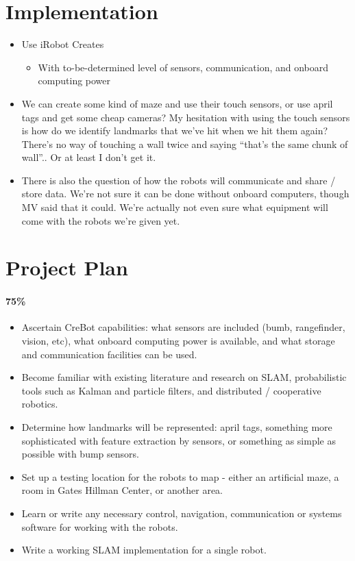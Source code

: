 \documentclass[11pt]{article}
\begin{document}
\section{Implementation}

\begin{itemize}
    \item Use iRobot Creates
        \begin{itemize}
            \item With to-be-determined level of sensors, communication, and onboard computing power
        \end{itemize}

    \item We can create some kind of maze and use their touch sensors, or use april tags and get some cheap cameras? My hesitation with using the touch sensors is how do we identify landmarks that we've hit when we hit them again? There's no way of touching a wall twice and saying ``that's the same chunk of wall''.. Or at least I don't get it.

    \item There is also the question of how the robots will communicate and share / store data.  We're not sure it can be done without onboard computers, though MV said that it could.  We're actually not even sure what equipment will come with the robots we're given yet.  

\end{itemize}

\section*{Project Plan}

\paragraph{75\%}
\begin{itemize}
    \item Ascertain CreBot capabilities: what sensors are included (bumb, rangefinder, vision, etc), what onboard computing power is available, and what storage and communication facilities can be used.
    \item Become familiar with existing literature and research on SLAM, probabilistic tools such as Kalman and particle filters, and distributed / cooperative robotics.
    \item Determine how landmarks will be represented: april tags, something more sophisticated with feature extraction by sensors, or something as simple as possible with bump sensors.
    \item Set up a testing location for the robots to map - either an artificial maze, a room in Gates Hillman Center, or another area.
    \item Learn or write any necessary control, navigation, communication or systems software for working with the robots.
    \item Write a working SLAM implementation for a single robot.
\end{itemize}
\end{document}
